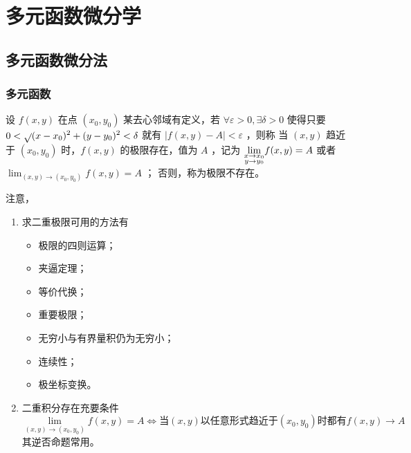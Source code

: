 \chapter{多元函数微分学}

\section{多元函数微分法}

\subsection{多元函数}

\begin{Def}[二元函数极限]

    设 $ f(x,y) $ 在点 $ (x_0,y_0) $ 某去心邻域有定义，若 $ \forall \varepsilon > 0, \exists \delta > 0 $ 
    使得只要 $ 0 < \displaystyle\sqrt{}{(x-x_0)^2+(y-y_0)^2}<\delta $ 就有 $ |f(x,y)-A|<\varepsilon $ ，则称
    当 $ (x,y) $ 趋近于 $ (x_0,y_0) $ 时，$ f(x,y) $ 的极限存在，值为 $ A $ ，记为
    $ {\displaystyle\lim_{\begin{subarray}{c}
        x\rightarrow x_0\\y\rightarrow y_0
    \end{subarray}}}f(x,y) = A $ 或者 $ {\displaystyle\lim_{(x,y)\rightarrow (x_0,y_0)}}f(x,y) = A $ ；
    否则，称为极限不存在。
\end{Def}

注意，\begin{enumerate}
    \item 求二重极限可用的方法有
    \begin{itemize}
        \item 极限的四则运算；
        \item 夹逼定理；
        \item 等价代换；
        \item 重要极限；
        \item 无穷小与有界量积仍为无穷小；
        \item 连续性；
        \item 极坐标变换。
    \end{itemize}
    \item 二重积分存在充要条件$$
        {\displaystyle\lim_{(x,y)\rightarrow (x_0,y_0)}}f(x,y) = A \Leftrightarrow
        \textrm{当} (x,y) \textrm{以任意形式趋近于} (x_0,y_0) \textrm{时都有} f(x,y)\rightarrow A
    $$ 
    其逆否命题常用。
\end{enumerate}


